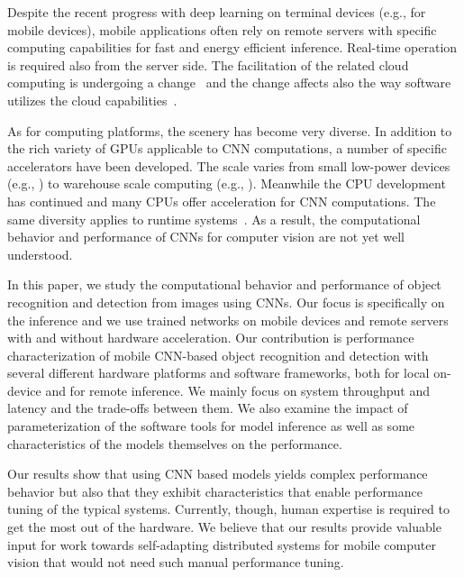 \documentclass[sigconf]{acmart}
\begin{document}
Despite the recent progress with deep learning on terminal devices (e.g., \cite{lane16deepx} for mobile devices), mobile applications often rely on remote servers with specific computing capabilities for fast and energy efficient inference. Real-time operation \cite{nishihara2017realtime} is required also from the server side. The facilitation of the related cloud computing is undergoing a change~\cite{yi15mobidata} and the change affects also the way software utilizes the cloud capabilities~\cite{maas2017cloud30}.

As for computing platforms, the scenery has become very diverse. In addition to the rich variety of GPUs applicable to CNN computations, a number of specific accelerators have been developed. The scale varies from small low-power devices (e.g., \cite{snpe}) to warehouse scale computing (e.g., \cite{jouppi17tpu}). Meanwhile the CPU development~\cite{lee2010debunk} has continued and many CPUs offer acceleration for CNN computations. The same diversity applies to runtime systems~\cite{nguyen2017notanother}. As a result, the computational behavior and performance of CNNs for computer vision are not yet well understood.

In this paper, we study the computational behavior and performance of object recognition and detection from images using CNNs. Our focus is specifically on the inference and we use trained networks on mobile devices and remote servers with and without hardware acceleration.
Our contribution is performance characterization of mobile CNN-based object recognition and detection with several different hardware platforms and software frameworks, both for local on-device and for remote inference. We mainly focus on system throughput and latency and the trade-offs between them. We also examine the impact of parameterization of the software tools for model inference as well as some characteristics of the models themselves on the performance.

Our results show that using CNN based models yields complex performance behavior but also that they exhibit characteristics that enable performance tuning of the typical systems. Currently, though, human expertise is required to get the most out of the hardware. We believe that our results provide valuable input for work towards self-adapting distributed systems for mobile computer vision that would not need such manual performance tuning.%
\end{document}
